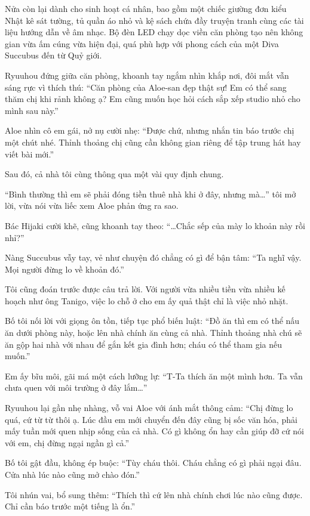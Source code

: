 \documentclass[../main.tex]{subfiles}
\begin{document}
Nửa còn lại dành cho sinh hoạt cá nhân, bao gồm một chiếc giường đơn kiểu Nhật kê sát tường, tủ quần áo nhỏ và kệ sách chứa đầy truyện tranh cùng các tài liệu hướng dẫn về âm nhạc. Bộ đèn LED chạy dọc viền căn phòng tạo nên không gian vừa ấm cúng vừa hiện đại, quá phù hợp với phong cách của một Diva Succubus đến từ Quỷ giới.

Ryuuhou đứng giữa căn phòng, khoanh tay ngắm nhìn khắp nơi, đôi mắt vẫn sáng rực vì thích thú: ``Căn phòng của Aloe-san đẹp thật sự! Em có thể sang thăm chị khi rảnh không ạ? Em cũng muốn học hỏi cách sắp xếp studio nhỏ cho mình sau này.''

Aloe nhìn cô em gái, nở nụ cười nhẹ: ``Được chứ, nhưng nhắn tin báo trước chị một chút nhé. Thỉnh thoảng chị cũng cần không gian riêng để tập trung hát hay viết bài mới.''

Sau đó, cả nhà tôi cùng thông qua một vài quy định chung.

``Bình thường thì em sẽ phải đóng tiền thuê nhà khi ở đây, nhưng mà\dots'' tôi mở lời, vừa nói vừa liếc xem Aloe phản ứng ra sao.

Bác Hijaki cười khẽ, cũng khoanh tay theo: ``\dots Chắc sếp của mày lo khoản này rồi nhỉ?''

Nàng Succubus vẫy tay, vẻ như chuyện đó chẳng có gì để bận tâm: ``Ta nghĩ vậy. Mọi người đừng lo về khoản đó.''

Tôi cũng đoán trước được câu trả lời. Với người vừa nhiều tiền vừa nhiều kế hoạch như ông Tanigo, việc lo chỗ ở cho em ấy quả thật chỉ là việc nhỏ nhặt.

Bố tôi nối lời với giọng ôn tồn, tiếp tục phổ biến luật: ``Đồ ăn thì em có thể nấu ăn dưới phòng này, hoặc lên nhà chính ăn cùng cả nhà. Thỉnh thoảng nhà chú sẽ ăn gộp hai nhà với nhau để gắn kết gia đình hơn; cháu có thể tham gia nếu muốn.''

Em ấy bĩu môi, gãi má một cách lưỡng lự: ``T-Ta thích ăn một mình hơn. Ta vẫn chưa quen với môi trường ở đây lắm\dots''

Ryuuhou lại gần nhẹ nhàng, vỗ vai Aloe với ánh mắt thông cảm: ``Chị đừng lo quá, cứ từ từ thôi ạ. Lúc đầu em mới chuyển đến đây cũng bị sốc văn hóa, phải mấy tuần mới quen nhịp sống của cả nhà. Có gì không ổn hay cần giúp đỡ cứ nói với em, chị đừng ngại ngần gì cả.''

Bố tôi gật đầu, không ép buộc: ``Tùy cháu thôi. Cháu chẳng có gì phải ngại đâu. Cửa nhà lúc nào cũng mở chào đón.''

Tôi nhún vai, bổ sung thêm: ``Thích thì cứ lên nhà chính chơi lúc nào cũng được. Chỉ cần báo trước một tiếng là ổn.''
\end{document}
